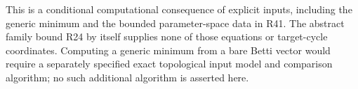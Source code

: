 This is a conditional computational consequence of explicit inputs,
including the generic minimum and the bounded parameter-space data in
R41. The abstract family bound R24 by itself supplies none of those
equations or target-cycle coordinates. Computing a generic minimum
from a bare Betti vector would require a separately specified exact
topological input model and comparison algorithm; no such additional
algorithm is asserted here.
